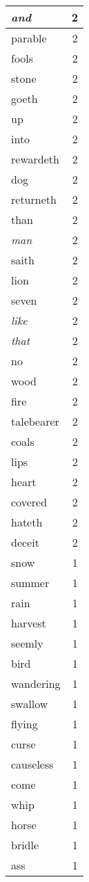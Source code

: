 \begin{center}
\begin{longtable}{l|r}
\emph{and} & 2\\ \hline 
parable & 2\\ \hline 
fools & 2\\ \hline 
stone & 2\\ \hline 
goeth & 2\\ \hline 
up & 2\\ \hline 
into & 2\\ \hline 
rewardeth & 2\\ \hline 
dog & 2\\ \hline 
returneth & 2\\ \hline 
than & 2\\ \hline 
\emph{man} & 2\\ \hline 
saith & 2\\ \hline 
lion & 2\\ \hline 
seven & 2\\ \hline 
\emph{like} & 2\\ \hline 
\emph{that} & 2\\ \hline 
no & 2\\ \hline 
wood & 2\\ \hline 
fire & 2\\ \hline 
talebearer & 2\\ \hline 
coals & 2\\ \hline 
lips & 2\\ \hline 
heart & 2\\ \hline 
covered & 2\\ \hline 
hateth & 2\\ \hline 
deceit & 2\\ \hline 
snow & 1\\ \hline 
summer & 1\\ \hline 
rain & 1\\ \hline 
harvest & 1\\ \hline 
seemly & 1\\ \hline 
bird & 1\\ \hline 
wandering & 1\\ \hline 
swallow & 1\\ \hline 
flying & 1\\ \hline 
curse & 1\\ \hline 
causeless & 1\\ \hline 
come & 1\\ \hline 
whip & 1\\ \hline 
horse & 1\\ \hline 
bridle & 1\\ \hline 
ass & 1\\ \hline 

\end{longtable}
\end{center}
